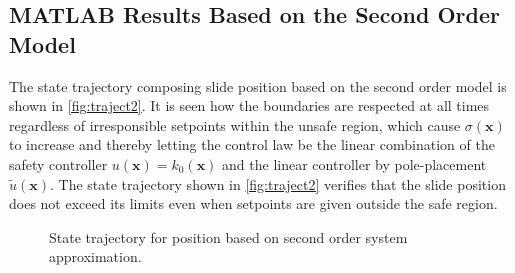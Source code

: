 \subsection{MATLAB Results Based on the Second Order Model}\label{subsec:matlab-resutls-2-order}
\vspace{-0.2cm}
The state trajectory composing slide position based on the second order model is shown in \autoref{fig:traject2}.
It is seen how the boundaries are respected at all times regardless of irresponsible setpoints within the unsafe region, which cause $\sigma(\mathbf{x})$ to increase and thereby letting the control law be the linear combination of the safety controller $u(\mathbf{x}) = k_0(\mathbf{x})$ and the linear controller by pole-placement $\tilde{u}(\mathbf{x})$.
The state trajectory shown in \autoref{fig:traject2} verifies that the slide position does not exceed its limits even when setpoints are given outside the safe region.
\vspace{-2mm}
\begin{figure}[H]
\hspace*{-5mm}\vspace*{-1mm}
%
%
\caption{State trajectory for position based on second order system approximation.}
\label{fig:traject2}
\end{figure}
%
%
%
%


